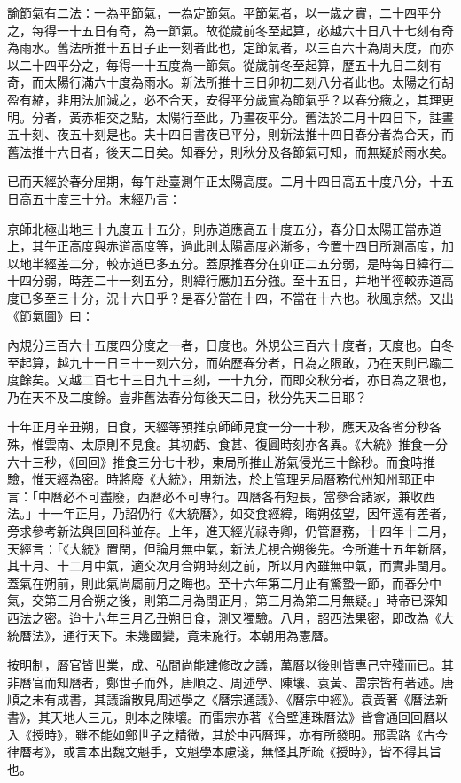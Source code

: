 諭節氣有二法：一為平節氣，一為定節氣。平節氣者，以一歲之實，二十四平分之，每得一十五日有奇，為一節氣。故從歲前冬至起算，必越六十日八十七刻有奇為雨水。舊法所推十五日子正一刻者此也，定節氣者，以三百六十為周天度，而亦以二十四平分之，每得一十五度為一節氣。從歲前冬至起算，歷五十九日二刻有奇，而太陽行滿六十度為雨水。新法所推十三日卯初二刻八分者此也。太陽之行胡盈有縮，非用法加減之，必不合天，安得平分歲實為節氣乎？以春分癥之，其理更明。分者，黃赤相交之點，太陽行至此，乃晝夜平分。舊法於二月十四日下，註晝五十刻、夜五十刻是也。夫十四日書夜已平分，則新法推十四日春分者為合天，而舊法推十六日者，後天二日矣。知春分，則秋分及各節氣可知，而無疑於雨水矣。

已而天經於春分屈期，每午赴臺測午正太陽高度。二月十四日高五十度八分，十五日高五十度三十分。末經乃言：

京師北極出地三十九度五十五分，則赤道應高五十度五分，春分日太陽正當赤道上，其午正高度與赤道高度等，過此則太陽高度必漸多，今置十四日所測高度，加以地半經差二分，較赤道已多五分。蓋原推春分在卯正二五分弱，是時每日緯行二十四分弱，時差二十一刻五分，則緯行應加五分強。至十五日，并地半徑較赤道高度已多至三十分，況十六日乎？是春分當在十四，不當在十六也。秋風京然。又出《節氣圖》曰：

內規分三百六十五度四分度之一者，日度也。外規公三百六十度者，天度也。自冬至起算，越九十一日三十一刻六分，而始歷春分者，日為之限敢，乃在天則已踰二度餘矣。又越二百七十三日九十三刻，一十九分，而即交秋分者，亦日為之限也，乃在天不及二度餘。豈非舊法春分每後天二日，秋分先天二日耶？

十年正月辛丑朔，日食，天經等預推京師師見食一分一十秒，應天及各省分秒各殊，惟雲南、太原則不見食。其初虧、食甚、復圓時刻亦各異。《大統》推食一分六十三秒，《回回》推食三分七十秒，東局所推止游氣侵光三十餘秒。而食時推驗，惟天經為密。時將廢《大統》，用新法，於上管理另局曆務代州知州郭正中言：「中曆必不可盡廢，西曆必不可專行。四曆各有短長，當參合諸家，兼收西法。」十一年正月，乃詔仍行《大統曆》，如交食經緯，晦朔弦望，因年遠有差者，旁求參考新法與回回科並存。上年，進天經光祿寺卿，仍管曆務，十四年十二月，天經言：「《大統》置閏，但論月無中氣，新法尤視合朔後先。今所進十五年新曆，其十月、十二月中氣，適交次月合朔時刻之前，所以月內雖無中氣，而實非閏月。蓋氣在朔前，則此氣尚屬前月之晦也。至十六年第二月止有驚蟄一節，而春分中氣，交第三月合朔之後，則第二月為閏正月，第三月為第二月無疑。」時帝已深知西法之密。迨十六年三月乙丑朔日食，測又獨驗。八月，詔西法果密，即改為《大統曆法》，通行天下。未幾國變，竟未施行。本朝用為憲曆。

按明制，曆官皆世業，成、弘間尚能建修改之議，萬曆以後則皆專己守殘而已。其非曆官而知曆者，鄭世子而外，唐順之、周述學、陳壤、袁黃、雷宗皆有著述。唐順之未有成書，其議論散見周述學之《曆宗通議》、《曆宗中經》。袁黃著《曆法新書》，其天地人三元，則本之陳壤。而雷宗亦著《合壁連珠曆法》皆會通回回曆以入《授時》，雖不能如鄭世子之精微，其於中西曆理，亦有所發明。邢雲路《古今律曆考》，或言本出魏文魁手，文魁學本慮淺，無怪其所疏《授時》，皆不得其旨也。

